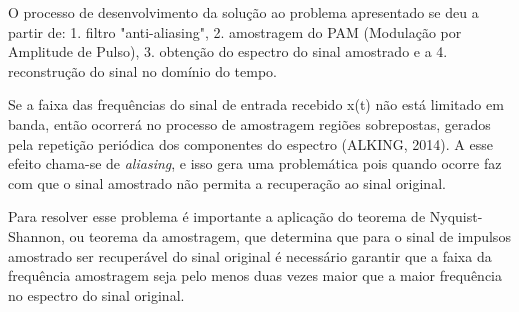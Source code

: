 O processo de desenvolvimento da solução ao problema apresentado se deu a partir de: 1. filtro "anti-aliasing", 2. amostragem do PAM (Modulação por Amplitude de Pulso), 3. obtenção do espectro do sinal amostrado e  a 4. reconstrução do sinal no domínio do tempo.

Se a faixa das frequências do sinal de entrada recebido x(t) não está limitado em banda, então ocorrerá no processo de amostragem regiões sobrepostas, gerados pela repetição periódica dos componentes do espectro (ALKING, 2014). A esse efeito chama-se de \textit{aliasing}, e isso gera uma problemática pois quando ocorre faz com que o sinal amostrado não permita a recuperação ao sinal original. 

Para resolver esse problema é importante a aplicação do teorema de Nyquist-Shannon, ou teorema da amostragem, que determina que para o sinal de impulsos amostrado ser recuperável do sinal original é necessário garantir que a faixa da frequência amostragem seja  pelo menos duas vezes maior que a maior frequência no espectro do sinal original.

